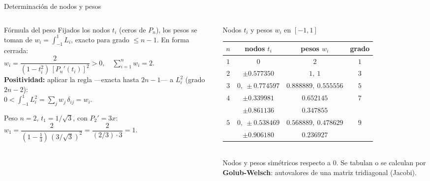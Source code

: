 \documentclass[aspectratio=169,10pt]{beamer}
\begin{document}
\begin{frame}{Determinación de nodos y pesos}
\begin{columns}[T]
\begin{column}{0.46\textwidth}
\begin{cardidea}{Fórmula del peso}{\faSuperscript}
{\footnotesize Fijados los nodos $t_i$ (ceros de $P_n$), los pesos se toman de $w_i=\int_{-1}^1 L_i$, exacto para grado $\le n-1$. En forma cerrada:\\[0.6mm]
$w_i=\dfrac{2}{(1-t_i^2)\,[P_n'(t_i)]^2}>0,\quad \sum_{i=1}^n w_i=2.$\\[0.9mm]
\textbf{Positividad:} aplicar la regla —exacta hasta $2n-1$— a $L_i^2$ (grado $2n-2$):\\[0.2mm]
$0<\int_{-1}^1 L_i^2=\sum_j w_j\,\delta_{ij}=w_i.$}
\end{cardidea}
\vspace{1mm}
\begin{cardnota}[\faCheckCircle]
{\footnotesize Peso $n{=}2$, $t_1{=}1/\sqrt3$, con $P_2'=3x$:\\[0.2mm]
$w_1=\dfrac{2}{(1-\tfrac13)\,(3/\sqrt3)^2}=\dfrac{2}{(2/3)\cdot3}=1.$}
\end{cardnota}
\end{column}
\begin{column}{0.52\textwidth}
\begin{cardgear}{Nodos $t_i$ y pesos $w_i$ en $[-1,1]$}{\faTable}
\centering
{\footnotesize\renewcommand{\arraystretch}{1.32}\setlength{\tabcolsep}{5pt}
\begin{tabular}{c|c|c|c}
$n$ & nodos $t_i$ & pesos $w_i$ & grado\\\hline
$1$ & $0$ & $2$ & $1$\\
$2$ & $\pm0.577350$ & $1,\ 1$ & $3$\\
$3$ & $0,\ \pm0.774597$ & $0.888889,\ 0.555556$ & $5$\\
$4$ & $\pm0.339981$ & $0.652145$ & $7$\\
   & $\pm0.861136$ & $0.347855$ & \\
$5$ & $0,\ \pm0.538469$ & $0.568889,\ 0.478629$ & $9$\\
   & $\pm0.906180$ & $0.236927$ & \\
\end{tabular}}\\[1.0mm]
{\footnotesize Nodos y pesos simétricos respecto a $0$. Se tabulan o se calculan por \textbf{Golub-Welsch}: autovalores de una matriz tridiagonal (Jacobi).}
\end{cardgear}
\end{column}
\end{columns}
\end{frame}
\end{document}
